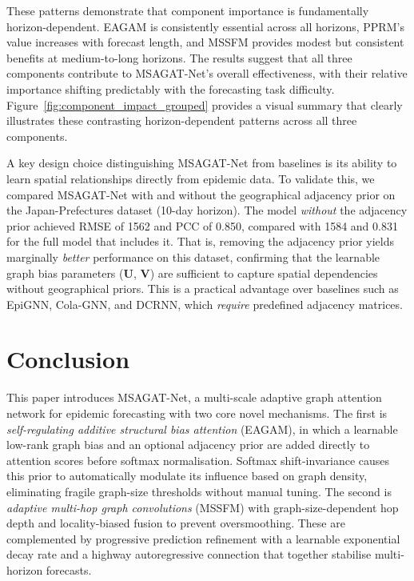 \documentclass[a4paper,fleqn]{cas-dc}
\begin{document}
These patterns demonstrate that component importance is fundamentally horizon-dependent. EAGAM is consistently essential across all horizons, PPRM's value increases with forecast length, and MSSFM provides modest but consistent benefits at medium-to-long horizons. The results suggest that all three components contribute to MSAGAT-Net's overall effectiveness, with their relative importance shifting predictably with the forecasting task difficulty. Figure~\ref{fig:component_impact_grouped} provides a visual summary that clearly illustrates these contrasting horizon-dependent patterns across all three components.

A key design choice distinguishing MSAGAT-Net from baselines is its ability to learn spatial relationships directly from epidemic data. To validate this, we compared MSAGAT-Net with and without the geographical adjacency prior on the Japan-Prefectures dataset (10-day horizon). The model \emph{without} the adjacency prior achieved RMSE of 1562 and PCC of 0.850, compared with 1584 and 0.831 for the full model that includes it. That is, removing the adjacency prior yields marginally \emph{better} performance on this dataset, confirming that the learnable graph bias parameters ($\mathbf{U}$, $\mathbf{V}$) are sufficient to capture spatial dependencies without geographical priors. This is a practical advantage over baselines such as EpiGNN, Cola-GNN, and DCRNN, which \emph{require} predefined adjacency matrices.


\section{Conclusion}
\label{sec:conclusion}

This paper introduces MSAGAT-Net, a multi-scale adaptive graph attention network for epidemic forecasting with two core novel mechanisms. The first is \emph{self-regulating additive structural bias attention} (EAGAM), in which a learnable low-rank graph bias and an optional adjacency prior are added directly to attention scores before softmax normalisation. Softmax shift-invariance causes this prior to automatically modulate its influence based on graph density, eliminating fragile graph-size thresholds without manual tuning. The second is \emph{adaptive multi-hop graph convolutions} (MSSFM) with graph-size-dependent hop depth and locality-biased fusion to prevent oversmoothing. These are complemented by progressive prediction refinement with a learnable exponential decay rate and a highway autoregressive connection that together stabilise multi-horizon forecasts.
\end{document}
